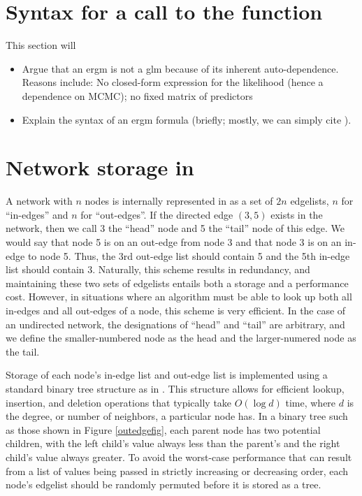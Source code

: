 \documentclass[article]{jss}
\begin{document}
\section[Syntax for a call to the ergm function]{Syntax for a call to the  function}
\label{syntax}

This section will
\begin{itemize}
\item Argue that an ergm is not a glm because of its inherent auto-dependence.
Reasons include:  No closed-form expression for the likelihood (hence a dependence
on MCMC); no fixed matrix of predictors
\item Explain the syntax of an ergm formula (briefly; mostly, we can simply cite
\citet{ergmtermsjss}).
\end{itemize}

\section[Network storage in ergm]{Network storage in }

A network with $n$ nodes is
internally represented in  as a set of $2n$ edgelists, 
$n$ for ``in-edges'' and $n$ for ``out-edges''.  If the directed edge $(3,5)$ exists in the network,
then we call 3 the ``head'' node and 5 the ``tail'' node of this edge.  We would say that node 5 is
on an out-edge from node 3 and that node 3 is on an in-edge to node 5.  Thus, the 3rd out-edge list
should contain 5 and the 5th in-edge list should contain 3.  Naturally, this scheme results in 
redundancy, and maintaining these two sets of edgelists entails both a storage and a performance
cost.  However, in situations where an algorithm must be able to look up both all in-edges and all
out-edges of a node, this scheme is very efficient.  
In the case of an undirected network, the designations of ``head'' and ``tail'' are arbitrary, and we
define the smaller-numbered node as the head and the larger-numered node as the tail.  

Storage of each node's in-edge list and out-edge list is implemented using a standard
binary tree structure
as in \cite[Chapter 13]{algorithms}.  This structure allows for efficient lookup, insertion, and deletion
operations that typically take $O(\log d)$ time, where $d$ is the degree, or number of neighbors, a
particular node has.  In a binary tree such as those shown in Figure \ref{outedgefig},
each parent node has two potential children, with the left child's value always less than the
parent's and the right child's value always greater.  To avoid the worst-case performance
that can result from a list of values being passed in strictly increasing or decreasing order,
each node's edgelist should be randomly permuted before it is stored as a tree.
\end{document}
